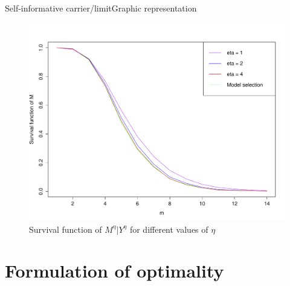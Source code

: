 \documentclass[10pt]{beamer}
\begin{document}
\begin{frame}{Self-informative carrier/limit}{Graphic representation}
\begin{figure}
\centering
 \includegraphics[width=.8\linewidth]{iteration.pdf}
\caption{Survival function of $M^{\eta}\vert Y^{\eta}$ for different values of $\eta$}\label{iteration}
\end{figure}
\end{frame}

\section{Formulation of optimality}
\end{document}
